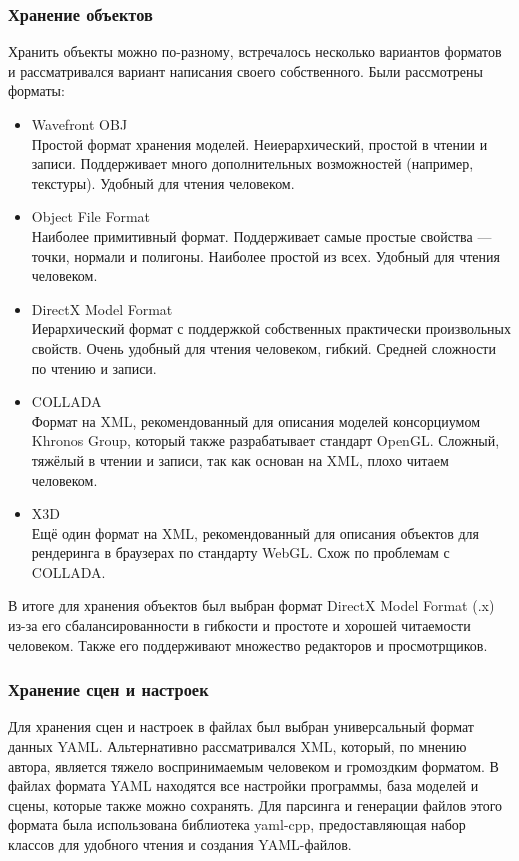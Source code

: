 \documentclass[a4paper,12pt]{report}
\begin{document}
\subsubsection{Хранение объектов}
Хранить объекты можно по-разному, встречалось несколько вариантов форматов и рассматривался вариант написания своего собственного.
Были рассмотрены форматы:
\begin{itemize}
\item Wavefront OBJ \\
Простой формат хранения моделей. Неиерархический, простой в чтении и записи. Поддерживает много дополнительных возможностей (например, текстуры). Удобный для чтения человеком.
\item Object File Format \\
Наиболее примитивный формат. Поддерживает самые простые свойства --- точки, нормали и полигоны. Наиболее простой из всех. Удобный для чтения человеком.
\item DirectX Model Format \\
Иерархический формат с поддержкой собственных практически произвольных свойств. Очень удобный для чтения человеком, гибкий. Средней сложности по чтению и записи.
\item COLLADA \\
Формат на XML, рекомендованный для описания моделей консорциумом Khronos Group, который также разрабатывает стандарт OpenGL. Сложный, тяжёлый в чтении и записи, так как основан на XML, плохо читаем человеком.
\item X3D \\
Ещё один формат на XML, рекомендованный для описания объектов для рендеринга в браузерах по стандарту WebGL. Схож по проблемам с COLLADA.
\end{itemize}
В итоге для хранения объектов был выбран формат DirectX Model Format (.x) из-за его сбалансированности в гибкости и простоте и хорошей читаемости человеком. Также его поддерживают множество редакторов и просмотрщиков.

\subsubsection{Хранение сцен и настроек}
Для хранения сцен и настроек в файлах был выбран универсальный формат данных YAML. Альтернативно рассматривался XML, который, по мнению автора, является тяжело воспринимаемым человеком и громоздким форматом. В файлах формата YAML находятся все настройки программы, база моделей и сцены, которые также можно сохранять. Для парсинга и генерации файлов этого формата была использована библиотека yaml-cpp, предоставляющая набор классов для удобного чтения и создания YAML-файлов.
\end{document}
